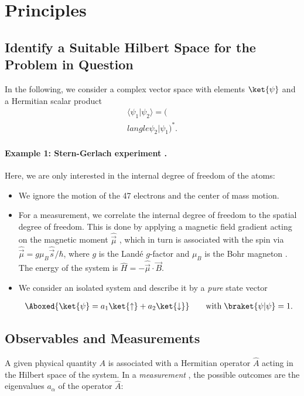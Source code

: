 \section{Principles}

\subsection{Identify a Suitable Hilbert Space for the Problem in Question}

In the following, we consider a complex vector space with elements $\ket{\psi}$ and a Hermitian scalar product
\begin{align}
				\langle{\psi_1}|\psi_2\rangle=(\\langle{\psi_2}| \psi_1)^*.
\end{align}
\paragraph{Example 1: Stern-Gerlach experiment .}

Here, we are only interested in the internal degree of freedom of the  atoms:

\begin{itemize}
						\item 	We ignore the motion of the 47 electrons and the center of mass motion.
						\item 	For a measurement, we correlate the internal degree of freedom to the spatial degree of freedom. This is done by applying a magnetic field gradient acting on the magnetic moment $\hat{\vec{\mu}}$ , which in turn is associated with the spin via $\hat{\vec{\mu}} = g \mu_B \hat{\vec{s}}/\hbar$, where $g$ is the Landé $g$-factor  and $\mu_B$ is the Bohr magneton . The energy of the system is $\hat{H} = -\hat{\vec{\mu}} \cdot \vec{B}$.
						\item 	We consider an isolated system and describe it by a \emph{pure} state vector

\begin{align}
							\Aboxed{\ket{\psi} = a_1 \ket{\uparrow} + a_2 \ket{\downarrow}}  \qquad \text{with} \; \braket{\psi | \psi} = 1.
						
\end{align}
					
\end{itemize}

\subsection{Observables and Measurements}
			A given physical quantity $A$ is associated with a Hermitian operator $\hat{A}$  acting in the Hilbert space  of the system.
						In a \emph{measurement} , the possible outcomes are the eigenvalues $a_\alpha$  of the operator $\hat{A}$:


